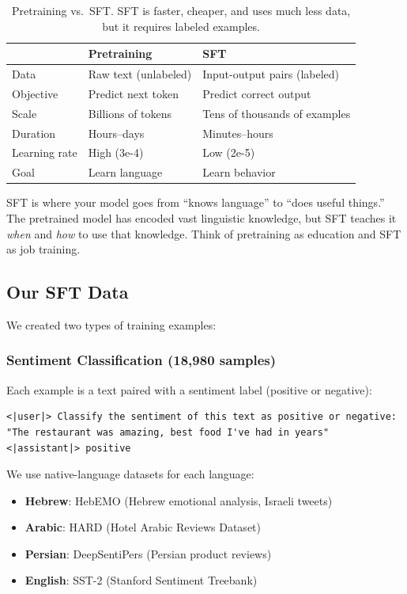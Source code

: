 \documentclass[11pt,a4paper]{article}
\begin{document}
\begin{table}[H]
\centering
\begin{tabular}{lll}
\toprule
 & \textbf{Pretraining} & \textbf{SFT} \\
\midrule
Data & Raw text (unlabeled) & Input-output pairs (labeled) \\
Objective & Predict next token & Predict correct output \\
Scale & Billions of tokens & Tens of thousands of examples \\
Duration & Hours--days & Minutes--hours \\
Learning rate & High (3e-4) & Low (2e-5) \\
Goal & Learn language & Learn behavior \\
\bottomrule
\end{tabular}
\caption{Pretraining vs.\ SFT. SFT is faster, cheaper, and uses much less data, but it requires labeled examples.}
\label{tab:pretrain_vs_sft}
\end{table}

\begin{keyidea}
SFT is where your model goes from ``knows language'' to ``does useful things.'' The pretrained model has encoded vast linguistic knowledge, but SFT teaches it \emph{when} and \emph{how} to use that knowledge. Think of pretraining as education and SFT as job training.
\end{keyidea}

\subsection{Our SFT Data}

We created two types of training examples:

\subsubsection{Sentiment Classification (18,980 samples)}

Each example is a text paired with a sentiment label (positive or negative):

\begin{lstlisting}[language={}, title={Example: Hebrew sentiment}]
<|user|> Classify the sentiment of this text as positive or negative:
"The restaurant was amazing, best food I've had in years"
<|assistant|> positive
\end{lstlisting}

We use native-language datasets for each language:
\begin{itemize}
    \item \textbf{Hebrew}: HebEMO (Hebrew emotional analysis, Israeli tweets)
    \item \textbf{Arabic}: HARD (Hotel Arabic Reviews Dataset)
    \item \textbf{Persian}: DeepSentiPers (Persian product reviews)
    \item \textbf{English}: SST-2 (Stanford Sentiment Treebank)
\end{itemize}
\end{document}
